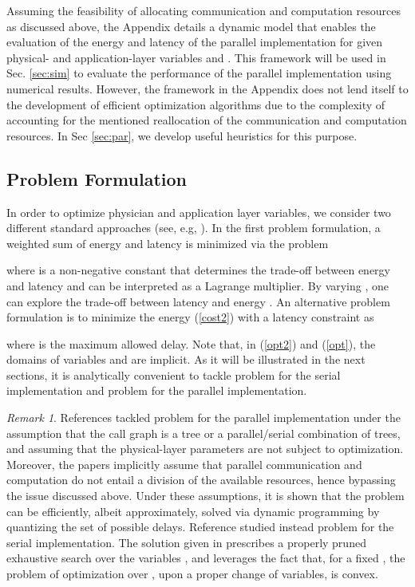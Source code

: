 \documentclass[journal,twocolumn,10pt,twoside]{IEEEtranTCOM}
\theoremstyle{plain}
\theoremstyle{plain}
\theoremstyle{remark}
\newtheorem{remark}{Remark}
\begin{document}
Assuming the feasibility of allocating communication and computation resources as discussed above, the Appendix details a dynamic model that enables the evaluation of the energy and latency of the parallel implementation for given physical- and application-layer variables  and . This framework will be used in Sec. \ref{sec:sim} to evaluate the performance of the parallel implementation using numerical results. However, the framework in the Appendix does not lend itself  to the development of efficient optimization algorithms due to the complexity of accounting for the mentioned reallocation of the communication and computation resources. In Sec \ref{sec:par}, we develop useful heuristics for this purpose.
\subsection{Problem Formulation}
In order to optimize physician and application layer variables, we consider two different standard approaches (see, e.g, \cite{boyd}). In the first problem formulation, a weighted sum of energy and latency is minimized via the problem

where  is a non-negative constant that determines the trade-off between energy and latency and can be interpreted as a Lagrange multiplier. By varying , one can explore the trade-off between latency and energy \cite{boyd}. An alternative problem formulation is to minimize the energy (\ref{cost2}) with a latency constraint as

where  is the maximum allowed delay. Note that, in (\ref{opt2}) and (\ref{opt}), the domains of variables  and  are implicit. As it will be illustrated in the next sections, it is analytically convenient to tackle problem  for the serial implementation and problem  for the parallel implementation.



\begin{remark} References \cite{no}\cite{hermp} tackled problem   for the parallel implementation under the assumption that the call graph is a tree or a parallel/serial combination of trees, and assuming that the physical-layer parameters  are not subject to optimization. Moreover, the papers \cite{no}\cite{hermp} implicitly assume that parallel communication and computation do not entail a division of the available resources, hence bypassing the issue discussed above. Under these assumptions, it is shown  that the problem can be efficiently, albeit approximately, solved via dynamic programming by quantizing the set of possible delays. Reference \cite{bar} studied instead problem  for the serial implementation. The solution given in \cite{bar} prescribes a properly pruned exhaustive search over the variables , and leverages the fact that, for a fixed , the problem of optimization over , upon a proper change of variables, is convex.
\end{remark}
\end{document}

